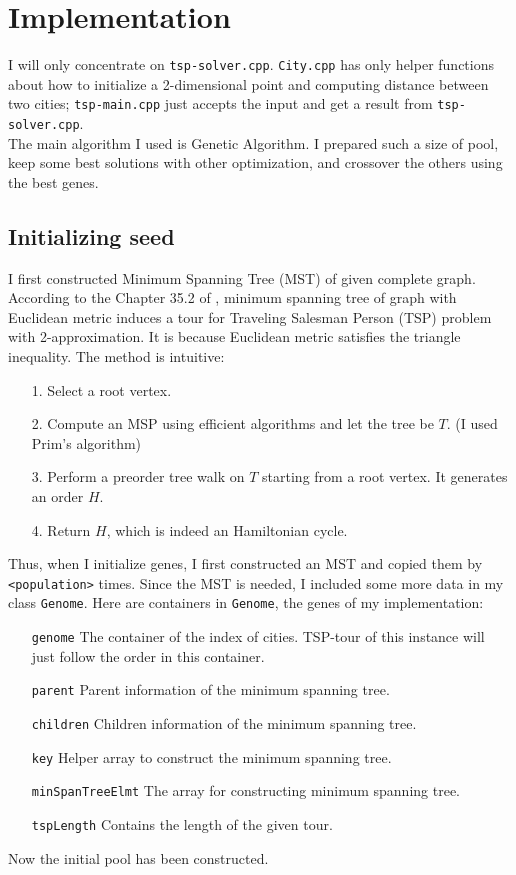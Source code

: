 \documentclass[11pt]{article}
\begin{document}
\section{Implementation} \label{sec:2}

I will only concentrate on \texttt{tsp-solver.cpp}. \texttt{City.cpp} has only helper functions about how to initialize a 2-dimensional point and computing distance between two cities; \texttt{tsp-main.cpp} just accepts the input and get a result from \texttt{tsp-solver.cpp}.\\
The main algorithm I used is Genetic Algorithm. I prepared such a size of pool, keep some best solutions with other optimization, and crossover the others using the best genes.

\subsection{Initializing seed} \label{ssec:2.1}
I first constructed Minimum Spanning Tree (MST) of given complete graph. According to the Chapter 35.2 of \cite{CLRS09}, minimum spanning tree of graph with Euclidean metric induces a tour for Traveling Salesman Person (TSP) problem with 2-approximation. It is because Euclidean metric satisfies the triangle inequality. The method is intuitive:
\begin{itemize}
	\item[1.] Select a root vertex.
	\item[2.] Compute an MSP using efficient algorithms and let the tree be $T$. (I used Prim's algorithm)
	\item[3.] Perform a preorder tree walk on $T$ starting from a root vertex. It generates an order $H$.
	\item[4.] Return $H$, which is indeed an Hamiltonian cycle.
\end{itemize}
Thus, when I initialize genes, I first constructed an MST and copied them by \texttt{<population>} times.
Since the MST is needed, I included some more data in my class \texttt{Genome}. Here are containers in \texttt{Genome}, the genes of my implementation:
\begin{itemize}
	\item[\texttt{genome}] The container of the index of cities. TSP-tour of this instance will just follow the order in this container.
	\item[\texttt{parent}] Parent information of the minimum spanning tree.
	\item[\texttt{children}] Children information of the minimum spanning tree.
	\item[\texttt{key}] Helper array to construct the minimum spanning tree.
	\item[\texttt{minSpanTreeElmt}] The array for constructing minimum spanning tree.
	\item[\texttt{tspLength}] Contains the length of the given tour.
\end{itemize}
Now the initial pool has been constructed.
\end{document}
